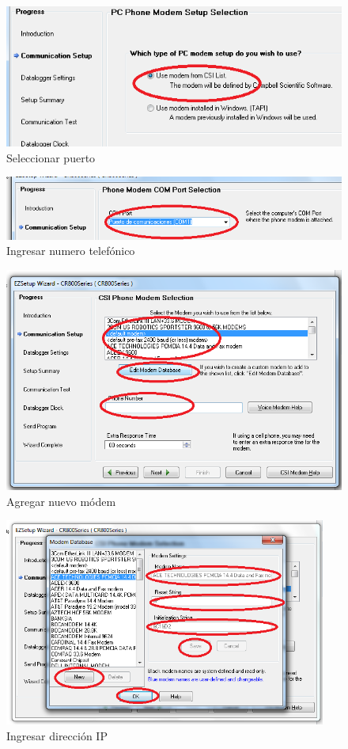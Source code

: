 \begin{figure}[h!]
        \centering
        \includegraphics[width=320pt]{images/modem2}
        \caption{Seleccionar puerto}
        \label{modem2}
\end{figure}
\newpage

\begin{figure}[h!]
        \centering
        \includegraphics[width=320pt]{images/modem3}
        \caption{Ingresar numero telefónico}
        \label{modem3}
\end{figure}
\begin{figure}[h!]
        \centering
        \includegraphics[width=320pt]{images/modem4}
        \caption{Agregar nuevo módem}
        \label{modem4}
\end{figure}

\newpage
\begin{figure}[h!]
        \centering
        \includegraphics[width=300pt]{images/modem5}
        \caption{Ingresar dirección IP}
        \label{modem5}
\end{figure}

